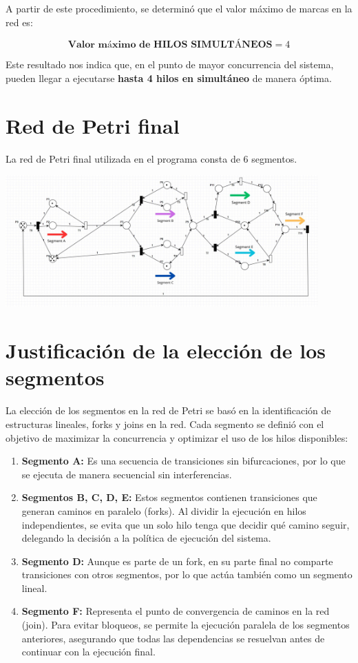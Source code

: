 \documentclass[12pt]{article}
\begin{document}
A partir de este procedimiento, se determinó que el valor máximo de marcas en la red es:

\[
\textbf{Valor máximo de HILOS SIMULTÁNEOS} = 4
\]

Este resultado nos indica que, en el punto de mayor concurrencia del sistema, pueden llegar a ejecutarse \textbf{hasta 4 hilos en simultáneo} de manera óptima.


\section{Red de Petri final}

La red de Petri final utilizada en el programa consta de 6 segmentos.
\begin{center}
    \includegraphics[width=0.9\textwidth]{Petri-Net-Final.jpeg}
\end{center}

\section{Justificación de la elección de los segmentos}

La elección de los segmentos en la red de Petri se basó en la identificación de estructuras lineales, forks y joins en la red. Cada segmento se definió con el objetivo de maximizar la concurrencia y optimizar el uso de los hilos disponibles:

\begin{enumerate}
    \item \textbf{Segmento A:} Es una secuencia de transiciones sin bifurcaciones, por lo que se ejecuta de manera secuencial sin interferencias.
    
    \item \textbf{Segmentos B, C, D, E:} Estos segmentos contienen transiciones que generan caminos en paralelo (forks). Al dividir la ejecución en hilos independientes, se evita que un solo hilo tenga que decidir qué camino seguir, delegando la decisión a la política de ejecución del sistema.
    
    \item \textbf{Segmento D:} Aunque es parte de un fork, en su parte final no comparte transiciones con otros segmentos, por lo que actúa también como un segmento lineal.
    
    \item \textbf{Segmento F:} Representa el punto de convergencia de caminos en la red (join). Para evitar bloqueos, se permite la ejecución paralela de los segmentos anteriores, asegurando que todas las dependencias se resuelvan antes de continuar con la ejecución final.
\end{enumerate}
\end{document}
